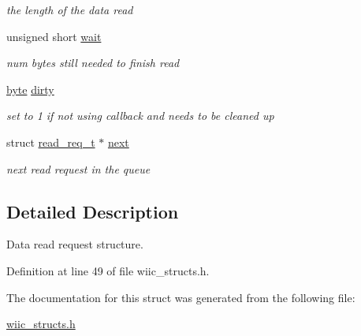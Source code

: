 \begin{DoxyCompactItemize}
\begin{DoxyCompactList}\small\item\em the length of the data read \end{DoxyCompactList}\item 
\hypertarget{structread__req__t_aa0e807ee1e193efc139b48c2acd8bdf7}{unsigned short \hyperlink{structread__req__t_aa0e807ee1e193efc139b48c2acd8bdf7}{wait}}\label{structread__req__t_aa0e807ee1e193efc139b48c2acd8bdf7}

\begin{DoxyCompactList}\small\item\em num bytes still needed to finish read \end{DoxyCompactList}\item 
\hypertarget{structread__req__t_a8ac72c3b91e371aaeadb4d01ed0fb303}{\hyperlink{wiic__macros_8h_a0c8186d9b9b7880309c27230bbb5e69d}{byte} \hyperlink{structread__req__t_a8ac72c3b91e371aaeadb4d01ed0fb303}{dirty}}\label{structread__req__t_a8ac72c3b91e371aaeadb4d01ed0fb303}

\begin{DoxyCompactList}\small\item\em set to 1 if not using callback and needs to be cleaned up \end{DoxyCompactList}\item 
\hypertarget{structread__req__t_a42e28e162a2c16885a00cf6e01177a9e}{struct \hyperlink{structread__req__t}{read\-\_\-req\-\_\-t} $\ast$ \hyperlink{structread__req__t_a42e28e162a2c16885a00cf6e01177a9e}{next}}\label{structread__req__t_a42e28e162a2c16885a00cf6e01177a9e}

\begin{DoxyCompactList}\small\item\em next read request in the queue \end{DoxyCompactList}\end{DoxyCompactItemize}


\subsection{Detailed Description}
Data read request structure. 

Definition at line 49 of file wiic\-\_\-structs.\-h.



The documentation for this struct was generated from the following file\-:\begin{DoxyCompactItemize}
\item 
\hyperlink{wiic__structs_8h}{wiic\-\_\-structs.\-h}\end{DoxyCompactItemize}
